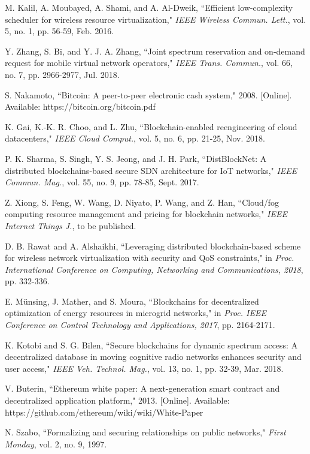 \documentclass[journal]{IEEEtran}
\begin{document}
\begin{thebibliography}{1}
 M. Kalil, A. Moubayed, A. Shami, and A. Al-Dweik, ``Efficient low-complexity scheduler for wireless resource virtualization," \emph{IEEE Wireless Commun. Lett.}, vol. 5, no. 1, pp. 56-59, Feb. 2016.
	
 Y. Zhang, S. Bi, and Y. J. A. Zhang, ``Joint spectrum reservation and on-demand request for mobile virtual network operators," \emph{IEEE Trans. Commun.}, vol. 66, no. 7, pp. 2966-2977, Jul. 2018.

 S. Nakamoto, ``Bitcoin: A peer-to-peer electronic cash system," 2008. [Online]. Available: https://bitcoin.org/bitcoin.pdf

 K. Gai, K.-K. R. Choo, and L. Zhu, ``Blockchain-enabled reengineering of cloud datacenters," \emph{IEEE Cloud Comput.}, vol. 5, no. 6, pp. 21-25, Nov. 2018.

 P. K. Sharma, S. Singh, Y. S. Jeong, and J. H. Park, ``DistBlockNet: A distributed blockchains-based secure SDN architecture for IoT networks," \emph{IEEE Commun. Mag.}, vol. 55, no. 9, pp. 78-85, Sept. 2017.

 Z. Xiong, S. Feng, W. Wang, D. Niyato, P. Wang, and Z. Han, ``Cloud/fog computing resource management and pricing for blockchain networks," \emph{IEEE Internet Things J.}, to be published.

 D. B. Rawat and A. Alshaikhi, ``Leveraging distributed blockchain-based scheme for wireless network virtualization with security and QoS constraints," in \emph{Proc. International Conference on Computing, Networking and Communications, 2018}, pp. 332-336.

 E. M\"{u}nsing, J. Mather, and S. Moura, ``Blockchains for decentralized optimization of energy resources in microgrid networks," in \emph{Proc. IEEE Conference on Control Technology and Applications, 2017}, pp. 2164-2171.

 K. Kotobi and S. G. Bilen, ``Secure blockchains for dynamic spectrum access: A decentralized database in moving cognitive radio networks enhances security and user access," \emph{IEEE Veh. Technol. Mag.}, vol. 13, no. 1, pp. 32-39, Mar. 2018.

{\color{red}
 V. Buterin, ``Ethereum white paper: A next-generation smart contract and decentralized application platform," 2013. [Online]. Available: https://github.com/ethereum/wiki/wiki/White-Paper
	
 N. Szabo, ``Formalizing and securing relationships on public networks," \emph{First Monday}, vol. 2, no. 9, 1997.
	
}
\end{thebibliography}
\end{document}
